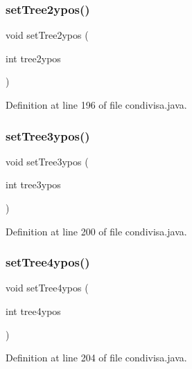 \subsubsection{\texorpdfstring{set\+Tree2ypos()}{setTree2ypos()}}
{\footnotesize\ttfamily void set\+Tree2ypos (\begin{DoxyParamCaption}\item[{int}]{tree2ypos }\end{DoxyParamCaption})}



Definition at line 196 of file condivisa.\+java.

\mbox{\label{classcargame_1_1condivisa_ad44cf98ca5b583b9611c581ccd26874a}} 
\subsubsection{\texorpdfstring{set\+Tree3ypos()}{setTree3ypos()}}
{\footnotesize\ttfamily void set\+Tree3ypos (\begin{DoxyParamCaption}\item[{int}]{tree3ypos }\end{DoxyParamCaption})}



Definition at line 200 of file condivisa.\+java.

\mbox{\label{classcargame_1_1condivisa_a27a081c3460dfa87ba577e3f0c24ee06}} 
\subsubsection{\texorpdfstring{set\+Tree4ypos()}{setTree4ypos()}}
{\footnotesize\ttfamily void set\+Tree4ypos (\begin{DoxyParamCaption}\item[{int}]{tree4ypos }\end{DoxyParamCaption})}



Definition at line 204 of file condivisa.\+java.

\mbox{\label{classcargame_1_1condivisa_aae978adead4d57b9ce11294fe9f06803}} 
